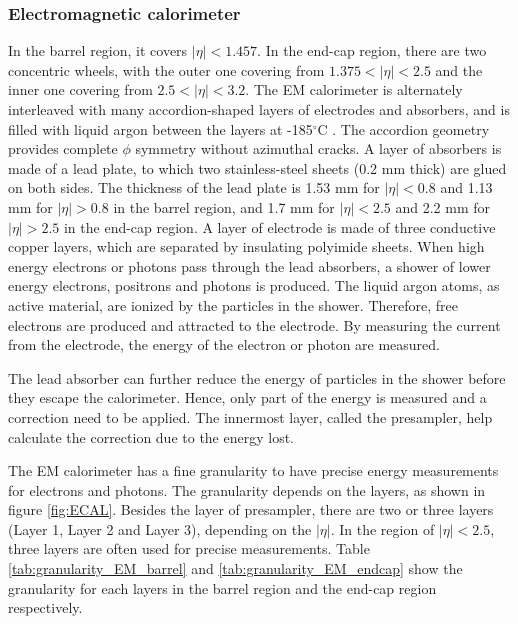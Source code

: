 \subsubsection{Electromagnetic calorimeter}
In the barrel region, it covers $|\eta| < 1.457$.
In the end-cap region, there are two concentric wheels, with the outer one covering from $1.375 <|\eta| < 2.5$ and the inner one covering from $2.5 <|\eta| < 3.2$.
The EM calorimeter is alternately interleaved with many accordion-shaped layers of electrodes and absorbers, and is filled with liquid argon between the layers at -185$^{\circ}$C .
The accordion geometry provides complete $\phi$ symmetry without azimuthal cracks.
A layer of absorbers is made of a lead plate, to which two stainless-steel sheets (0.2 mm thick) are glued on both sides.
The thickness of the lead plate is 1.53 mm for $|\eta| < 0.8$ and 1.13 mm for $|\eta| > 0.8$ in the barrel region, and 1.7 mm for $|\eta| < 2.5$ and 2.2 mm for $|\eta| > 2.5$ in the end-cap region.
A layer of electrode is made of three conductive copper layers, which are separated by insulating polyimide sheets.
When high energy electrons or photons pass through the lead absorbers, a shower of lower energy electrons, positrons and photons is produced.
The liquid argon atoms, as active material, are ionized by the particles in the shower.
Therefore, free electrons are produced and attracted to the electrode.
By measuring the current from the electrode, the energy of the electron or photon are measured.

The lead absorber can further reduce the energy of particles in the shower before they escape the calorimeter.
Hence, only part of the energy is measured and a correction need to be applied.
The innermost layer, called the presampler, help calculate the correction due to the energy lost.

The EM calorimeter has a fine granularity to have precise energy measurements for electrons and photons.
The granularity depends on the layers, as shown in figure \ref{fig:ECAL}.
Besides the layer of presampler, there are two or three layers (Layer 1, Layer 2 and Layer 3), depending on the $|\eta|$.
In the region of $|\eta|<2.5$, three layers are often used for precise measurements.
Table \ref{tab:granularity_EM_barrel} and \ref{tab:granularity_EM_endcap} show the granularity for each layers in the barrel region and the end-cap region respectively.

